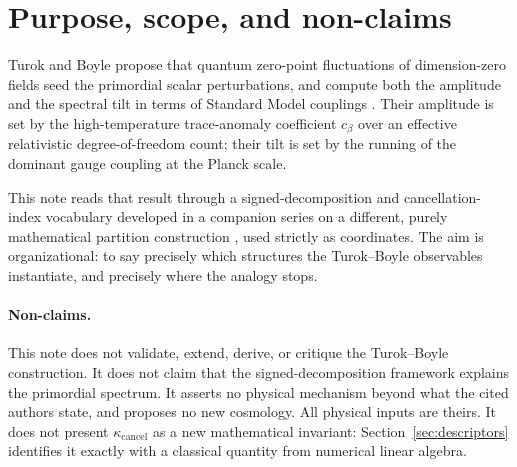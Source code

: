 \documentclass[11pt]{article}
\theoremstyle{definition}
\theoremstyle{remark}
\newcommand{\kcancel}{\kappa_{\mathrm{cancel}}}
\begin{document}
\begin{abstract}
decomposition-free value. Applied to Turok and Boyle's own coefficients, the gauge-factor
decomposition gives $\kcancel \approx 0.20$; refining each channel into its gauge-boson and matter
parts --- a split Turok and Boyle display for $SU(3)$ and which we show holds uniformly --- leaves
the net unchanged but raises $\kcancel$ to $0.64$; evaluating the same expression at the
electroweak scale gives $\kcancel \approx 0.002$. So $\kcancel \approx 0.20$ is a descriptor of one
stated decomposition at one stated scale and truncation, not a property of the Standard Model. We
also distinguish, throughout, between algebraic constructions used only to witness
non-identifiability (an arbitrary two-component split, a global sign flip) and the one
physically motivated refinement available here (gauge boson versus matter, at fixed order and
scale); the former are not alternative physically realizable decompositions of $c_\beta$. No claim
is made about the validity of the Turok--Boyle construction, which remains contested in the
refereed literature \citep{ClineHell2026}.
\end{abstract}

\tableofcontents

\section{Purpose, scope, and non-claims}
\label{sec:purpose}

Turok and Boyle propose that quantum zero-point fluctuations of dimension-zero fields seed the
primordial scalar perturbations, and compute both the amplitude and the spectral tilt in terms of
Standard Model couplings \citep{TurokBoyle2023}. Their amplitude is set by the high-temperature
trace-anomaly coefficient $c_\beta$ over an effective relativistic degree-of-freedom count; their
tilt is set by the running of the dominant gauge coupling at the Planck scale.

This note reads that result through a signed-decomposition and cancellation-index vocabulary
developed in a companion series on a different, purely mathematical partition construction
\citep{DeJesusThalesAtlas2026,DeJesusContextResolver2026,DeJesusPartitionFlows2026,DeJesusCompactness2026},
used strictly as coordinates. The aim is organizational: to say precisely which structures the
Turok--Boyle observables instantiate, and precisely where the analogy stops.

\paragraph{Non-claims.} This note does not validate, extend, derive, or critique the Turok--Boyle
construction. It does not claim that the signed-decomposition framework explains the primordial
spectrum. It asserts no physical mechanism beyond what the cited authors state, and proposes no new
cosmology. All physical inputs are theirs. It does not present $\kcancel$ as a new mathematical
invariant: Section~\ref{sec:descriptors} identifies it exactly with a classical quantity from
numerical linear algebra.
\end{document}
